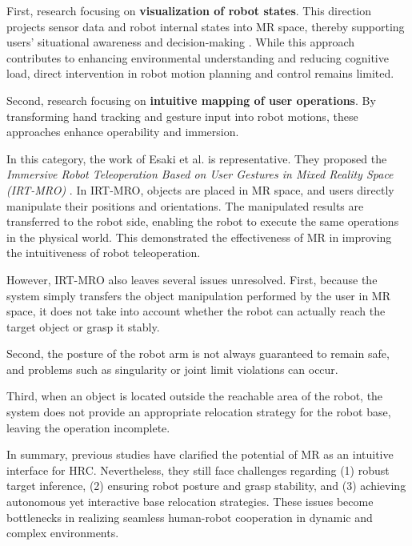 \documentclass[../../main.tex]{subfiles} %
\begin{document}
First, research focusing on \textbf{visualization of robot states}.  
This direction projects sensor data and robot internal states into MR space, 
thereby supporting users’ situational awareness and decision-making \cite{ref4}.  
While this approach contributes to enhancing environmental understanding and reducing cognitive load, 
direct intervention in robot motion planning and control remains limited.

Second, research focusing on \textbf{intuitive mapping of user operations}.  
By transforming hand tracking and gesture input into robot motions, these approaches enhance 
operability and immersion.

In this category, the work of Esaki et al. is representative.  
They proposed the \textit{Immersive Robot Teleoperation Based on User Gestures in Mixed Reality Space (IRT-MRO)} \cite{ref5}.  
In IRT-MRO, objects are placed in MR space, and users directly manipulate their positions and orientations.  
The manipulated results are transferred to the robot side, enabling the robot to 
execute the same operations in the physical world.  
This demonstrated the effectiveness of MR in improving the intuitiveness of robot teleoperation.  

However, IRT-MRO also leaves several issues unresolved.  
First, because the system simply transfers the object manipulation performed by the user in MR space, 
it does not take into account whether the robot can actually reach the target object or grasp it stably.  

Second, the posture of the robot arm is not always guaranteed to remain safe, 
and problems such as singularity or joint limit violations can occur.  

Third, when an object is located outside the reachable area of the robot, 
the system does not provide an appropriate relocation strategy for the robot base, 
leaving the operation incomplete.  

In summary, previous studies have clarified the potential of MR as an intuitive interface for HRC.  
Nevertheless, they still face challenges regarding (1) robust target inference, 
(2) ensuring robot posture and grasp stability, and (3) achieving autonomous yet 
interactive base relocation strategies.  
These issues become bottlenecks in realizing seamless human-robot cooperation in dynamic and complex environments.  
\end{document}
